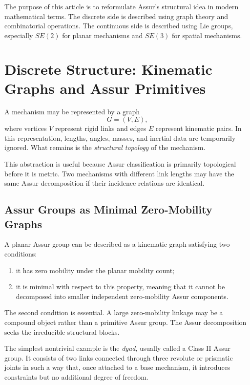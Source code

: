 \documentclass[12pt,a4paper]{article}
\begin{document}
The purpose of this article is to reformulate Assur's structural idea in modern mathematical terms. The discrete side is described using graph theory and combinatorial operations. The continuous side is described using Lie groups, especially $SE(2)$ for planar mechanisms and $SE(3)$ for spatial mechanisms.

\section{Discrete Structure: Kinematic Graphs and Assur Primitives}

A mechanism may be represented by a graph
\[
G = (V,E),
\]
where vertices $V$ represent rigid links and edges $E$ represent kinematic pairs. In this representation, lengths, angles, masses, and inertial data are temporarily ignored. What remains is the \emph{structural topology} of the mechanism.

This abstraction is useful because Assur classification is primarily topological before it is metric. Two mechanisms with different link lengths may have the same Assur decomposition if their incidence relations are identical.

\subsection{Assur Groups as Minimal Zero-Mobility Graphs}

A planar Assur group can be described as a kinematic graph satisfying two conditions:

\begin{enumerate}[label=(\roman*)]
\item it has zero mobility under the planar mobility count;
\item it is minimal with respect to this property, meaning that it cannot be decomposed into smaller independent zero-mobility Assur components.
\end{enumerate}

The second condition is essential. A large zero-mobility linkage may be a compound object rather than a primitive Assur group. The Assur decomposition seeks the irreducible structural blocks.

The simplest nontrivial example is the \emph{dyad}, usually called a Class II Assur group. It consists of two links connected through three revolute or prismatic joints in such a way that, once attached to a base mechanism, it introduces constraints but no additional degree of freedom.
\end{document}
